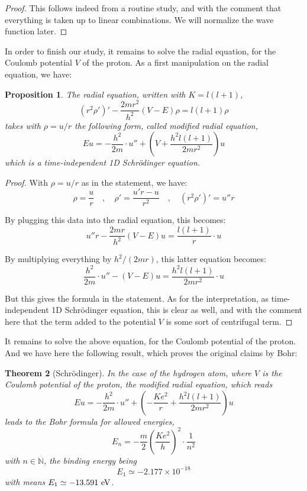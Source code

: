 \documentclass[12pt]{amsbook}
\newtheorem{theorem}{Theorem}[chapter]
\newtheorem{proposition}[theorem]{Proposition}
\begin{document}
\begin{proof}
This follows indeed from a routine study, and with the comment that everything is taken up to linear combinations. We will normalize the wave function later.
\end{proof}

In order to finish our study, it remains to solve the radial equation, for the Coulomb potential $V$ of the proton. As a first manipulation on the radial equation, we have:

\begin{proposition}
The radial equation, written with $K=l(l+1)$, 
$$(r^2\rho')'-\frac{2mr^2}{h^2}(V-E)\rho=l(l+1)\rho$$
takes with $\rho=u/r$ the following form, called modified radial equation,
$$Eu=-\frac{h^2}{2m}\cdot u''+\left(V+\frac{h^2l(l+1)}{2mr^2}\right)u$$
which is a time-independent 1D Schr\"odinger equation.
\end{proposition}

\begin{proof}
With $\rho=u/r$ as in the statement, we have:
$$\rho=\frac{u}{r}\quad,\quad \rho'=\frac{u'r-u}{r^2}\quad,\quad (r^2\rho')'=u''r$$

By plugging this data into the radial equation, this becomes:
$$u''r-\frac{2mr}{h^2}(V-E)u=\frac{l(l+1)}{r}\cdot u$$

By multiplying everything by $h^2/(2mr)$, this latter equation becomes:
$$\frac{h^2}{2m}\cdot u''-(V-E)u=\frac{h^2l(l+1)}{2mr^2}\cdot u$$

But this gives the formula in the statement. As for the interpretation, as time-independent 1D Schr\"odinger equation, this is clear as well, and with the comment here that the term added to the potential $V$ is some sort of centrifugal term.
\end{proof}

It remains to solve the above equation, for the Coulomb potential of the proton. And we have here the following result, which proves the original claims by Bohr:

\begin{theorem}[Schr\"odinger]
In the case of the hydrogen atom, where $V$ is the Coulomb potential of the proton, the modified radial equation, which reads
$$Eu=-\frac{h^2}{2m}\cdot u''+\left(-\frac{Ke^2}{r}+\frac{h^2l(l+1)}{2mr^2}\right)u$$
leads to the Bohr formula for allowed energies,
$$E_n=-\frac{m}{2}\left(\frac{Ke^2}{h}\right)^2\cdot\frac{1}{n^2}$$
with $n\in\mathbb N$, the binding energy being 
$$E_1\simeq-2.177\times 10^{-18}$$
with means $E_1\simeq-13.591\ {\rm eV}$.
\end{theorem}
\end{document}
